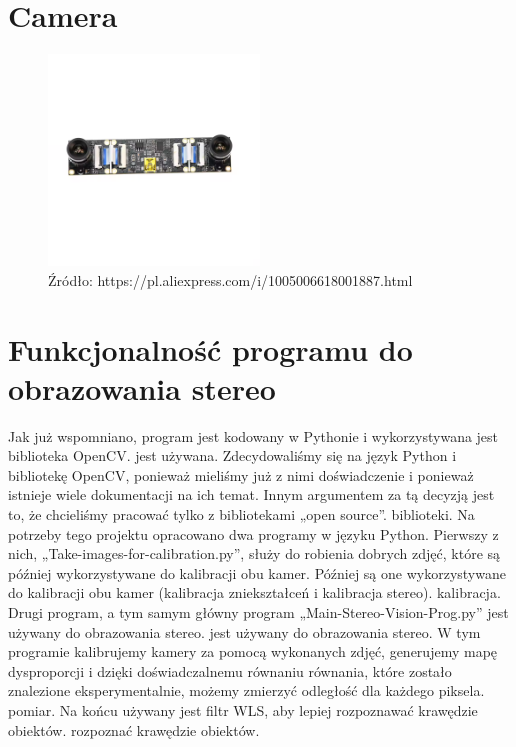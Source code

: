 \documentclass[magisterska]{pracadypl}
\begin{document}
\section{Camera}

\begin{figure}[h]  %
    \centering  %
    \includegraphics[width=0.5\textwidth]{images/MAINSTEREO.png}  %
    \captionsetup{labelformat=empty, font=footnotesize}
    \caption{Źródło: https://pl.aliexpress.com/i/1005006618001887.html}
    \label{fig:mono}  %
\end{figure}

\section{Funkcjonalność programu do obrazowania stereo}

Jak już wspomniano, program jest kodowany w Pythonie i wykorzystywana jest biblioteka OpenCV.
jest używana. Zdecydowaliśmy się na język Python i bibliotekę OpenCV, ponieważ
mieliśmy już z nimi doświadczenie i ponieważ istnieje wiele dokumentacji na ich temat. Innym
argumentem za tą decyzją jest to, że chcieliśmy pracować tylko z bibliotekami „open source”.
biblioteki.
Na potrzeby tego projektu opracowano dwa programy w języku Python.
Pierwszy z nich, „Take-images-for-calibration.py”, służy do robienia dobrych zdjęć, które są później wykorzystywane do kalibracji obu kamer.
Później są one wykorzystywane do kalibracji obu kamer (kalibracja zniekształceń i kalibracja stereo).
kalibracja.
Drugi program, a tym samym główny program „Main-Stereo-Vision-Prog.py” jest używany do obrazowania stereo.
jest używany do obrazowania stereo. W tym programie kalibrujemy kamery za pomocą wykonanych zdjęć, generujemy mapę dysproporcji i dzięki doświadczalnemu równaniu
równania, które zostało znalezione eksperymentalnie, możemy zmierzyć odległość dla każdego piksela.
pomiar. Na końcu używany jest filtr WLS, aby lepiej rozpoznawać krawędzie obiektów.
rozpoznać krawędzie obiektów.
\end{document}
